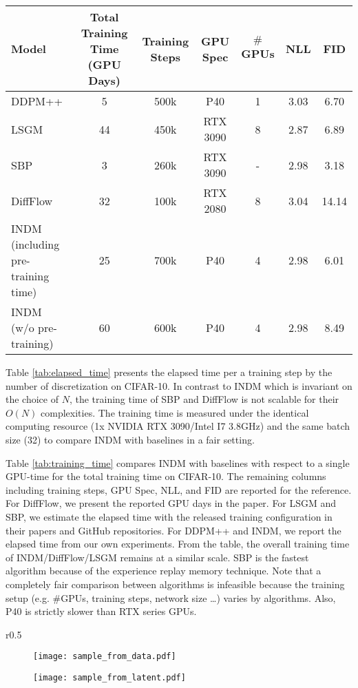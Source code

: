\documentclass{article}
\theoremstyle{definition}
\theoremstyle{remark}
\begin{document}
	\begin{table*}[t]
		\caption{Total training time in a single GPU days.}
		\label{tab:training_time}
		\scriptsize
		\centering
		\begin{tabular}{lcccccc}
			\toprule
			Model & Total Training Time (GPU Days) & Training Steps & GPU Spec & $\#$GPUs & NLL & FID \\\midrule
			DDPM++ & 5 & 500k & P40 & 1 & 3.03 & 6.70 \\
			LSGM & 44 & 450k & RTX 3090 & 8 & 2.87 & 6.89 \\
			SBP & 3 & 260k & RTX 3090 & - & 2.98 & 3.18 \\
			DiffFlow & 32 & 100k & RTX 2080 & 8 & 3.04 & 14.14 \\
			INDM (including pre-training time) & 25 & 700k & P40 & 4 & 2.98 & 6.01 \\
			INDM (w/o pre-training) & 60 & 600k & P40 & 4 & 2.98 & 8.49 \\
			\bottomrule
		\end{tabular}
	\end{table*}
	
	Table \ref{tab:elapsed_time} presents the elapsed time per a training step by the number of discretization on CIFAR-10. In contrast to INDM which is invariant on the choice of $N$, the training time of SBP and DiffFlow is not scalable for their $O(N)$ complexities. The training time is measured under the identical computing resource (1x NVIDIA RTX 3090/Intel I7 3.8GHz) and the same batch size (32) to compare INDM with baselines in a fair setting.
	
	Table \ref{tab:training_time} compares INDM with baselines with respect to a single GPU-time for the total training time on CIFAR-10. The remaining columns including training steps, GPU Spec, NLL, and FID are reported for the reference. For DiffFlow, we present the reported GPU days in the paper. For LSGM and SBP, we estimate the elapsed time with the released training configuration in their papers and GitHub repositories. For DDPM++ and INDM, we report the elapsed time from our own experiments. From the table, the overall training time of INDM/DiffFlow/LSGM remains at a similar scale. SBP is the fastest algorithm because of the experience replay memory technique. Note that a completely fair comparison between algorithms is infeasible because the training setup (e.g. $\#$GPUs, training steps, network size …) varies by algorithms. Also, P40 is strictly slower than RTX series GPUs.
	
	\begin{wrapfigure}{r}{0.5\textwidth}
		\vskip -0.45in	
		\begin{subfigure}{0.48\linewidth}
			\texttt{[image: sample\_from\_data.pdf]}
		\end{subfigure}
		\begin{subfigure}{0.48\linewidth}
			\texttt{[image: sample\_from\_latent.pdf]}
		\end{subfigure}
		\vskip -0.05in
		\caption{Samples from the data space and latent space on CIFAR-10 and CelebA.}
		\label{fig:samples_}
		\vskip -0.15in
	\end{wrapfigure}
\end{document}
